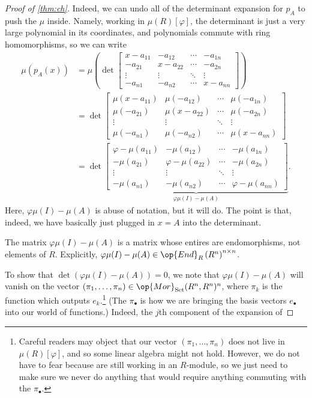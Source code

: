 \begin{proof}[Proof of \autoref{thm:ch}]
	Indeed, we can undo all of the determinant expansion for $p_A$ to push the $\mu$ inside. Namely, working in $\mu(R)[\varphi]$, the determinant is just a very large polynomial in its coordinates, and polynomials commute with ring homomorphisms, so we can write
	\begin{align*}
		\mu(p_A(x)) &= \mu\left(\det\begin{bmatrix}
			x-a_{11} & -a_{12} & \cdots & -a_{1n} \\
			-a_{21} & x-a_{22} & \cdots & -a_{2n} \\
			\vdots & \vdots & \ddots & \vdots \\
			-a_{n1} & -a_{n2} & \cdots & x-a_{nn}
		\end{bmatrix}\right) \\
		&=\det\begin{bmatrix}
			\mu(x-a_{11}) & \mu(-a_{12}) & \cdots & \mu(-a_{1n}) \\
			\mu(-a_{21}) & \mu(x-a_{22}) & \cdots & \mu(-a_{2n}) \\
			\vdots & \vdots & \ddots & \vdots \\
			\mu(-a_{n1}) & \mu(-a_{n2}) & \cdots & \mu(x-a_{nn})
		\end{bmatrix} \\
		&=\det\underbrace{\begin{bmatrix}
			\varphi-\mu(a_{11}) & -\mu(a_{12}) & \cdots & -\mu(a_{1n}) \\
			-\mu(a_{21}) & \varphi-\mu(a_{22}) & \cdots & -\mu(a_{2n}) \\
			\vdots & \vdots & \ddots & \vdots \\
			-\mu(a_{n1}) & -\mu(a_{n2}) & \cdots & \varphi-\mu(a_{nn})
		\end{bmatrix}}_{\varphi\mu(I)-\mu(A)}.
	\end{align*}
	Here, $\varphi\mu(I)-\mu(A)$ is abuse of notation, but it will do. The point is that, indeed, we have basically just plugged in $x=A$ into the determinant.
	\begin{warn}
		The matrix $\varphi\mu(I)-\mu(A)$ is a matrix whose entires are endomorphisms, not elements of $R$. Explicitly, $\varphi\mu(I)-\mu(A)\in\op{End}_R\left(R^n\right)^{n\times n}$.
	\end{warn}
	To show that $\det(\varphi\mu(I)-\mu(A))=0$, we note that $\varphi\mu(I)-\mu(A)$ will vanish on the vector $(\pi_1,\ldots,\pi_n)\in\op{Mor}_{\mathrm{Set}}(R^n,R^n)^n$, where $\pi_k$ is the function which outputs $e_k$.\footnote{Careful readers may object that our vector $(\pi_1,\ldots,\pi_n)$ does not live in $\mu(R)[\varphi]$, and so some linear algebra might not hold. However, we do not have to fear because are still working in an $R$-module, so we just need to make sure we never do anything that would require anything commuting with the $\pi_\bullet$.} (The $\pi_\bullet$ is how we are bringing the basis vectors $e_\bullet$ into our world of functions.) Indeed, the $j$th component of the expansion of

\end{proof}
